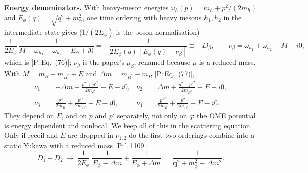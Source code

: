 \documentclass[11pt,a4paper]{article}
\newcommand{\tagP}[1]{\textcolor{blue!65!black}{\textsf{\small[P:\,#1]}}}
\newenvironment{aiadd}{\par}{\par}
\begin{document}
\begin{aiadd}
	\textbf{Energy denominators.} With heavy-meson energies $\omega_h(p)=m_h+p^2/(2m_h)$ and $E_\phi(q)=\sqrt{q^2+m_\phi^2}$, one time ordering with heavy mesons $h_1,h_2$ in the intermediate state gives ($1/(2E_\phi)$ is the boson normalisation)
	\[
		\frac{1}{2E_\phi}\,\frac{1}{M-\omega_{h_1}-\omega_{h_2}-E_\phi+i0}=-\frac{1}{2E_\phi(q)\,[E_\phi(q)+\nu_\beta]}\equiv-D_\beta,\qquad
		\nu_\beta=\omega_{h_1}+\omega_{h_2}-M-i0,
	\]
	which is \tagP{Eq.~(76)}; $\nu_\beta$ is the paper's $\mu_\beta$, renamed because $\mu$ is a reduced mass. With $M=m_B+m_{B^*}+E$ and $\Delta m=m_{B^*}-m_B$ \tagP{Eq.~(77)},
	\begin{align*}
		\nu_1 & =-\Delta m+\frac{p^2+p'^2}{2m_B}-E-i0,        & \nu_2 & =\Delta m+\frac{p^2+p'^2}{2m_{B^*}}-E-i0,     \\
		\nu_3 & =\frac{p^2}{2m_B}+\frac{p'^2}{2m_{B^*}}-E-i0, & \nu_4 & =\frac{p'^2}{2m_B}+\frac{p^2}{2m_{B^*}}-E-i0.
	\end{align*}
	They depend on $E$, and on $p$ and $p'$ separately, not only on $q$: the OME potential is energy dependent and nonlocal. We keep all of this in the scattering equation. Only if recoil and $E$ are dropped in $\nu_{1,2}$ do the first two orderings combine into a static Yukawa with a reduced mass \tagP{l.\,1109}:
	\[
		D_1+D_2\ \to\ \frac{1}{2E_\phi}\Big[\frac{1}{E_\phi-\Delta m}+\frac{1}{E_\phi+\Delta m}\Big]=\frac{1}{\bm q^2+m_\phi^2-\Delta m^2}.
	\]


\end{aiadd}
\end{document}
